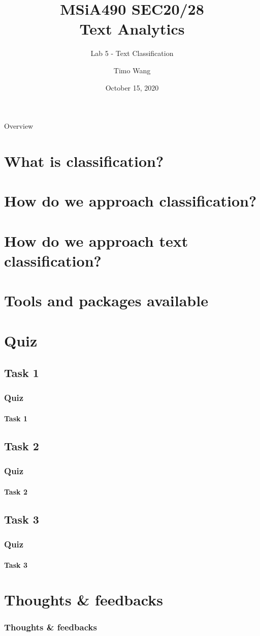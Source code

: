 \documentclass{beamer}
\begin{document}
\title{MSiA490 SEC20/28\\ Text Analytics}
\subtitle{Lab 5 - Text Classification}
\author{Timo Wang}
\date{October 15, 2020}

\begin{frame}
    \titlepage
\end{frame}

\begin{frame}{Overview}
    \tableofcontents[hideallsubsections]
\end{frame}

\section{What is classification?}

\section{How do we approach classification?}

\section{How do we approach text classification?}

\section{Tools and packages available}

\section{Quiz}
\subsection{Task 1}
\begin{frame}
    \frametitle{Quiz}
    \framesubtitle{Task 1}
\end{frame}

\subsection{Task 2}
\begin{frame}
    \frametitle{Quiz}
    \framesubtitle{Task 2}
\end{frame}

\subsection{Task 3}
\begin{frame}
    \frametitle{Quiz}
    \framesubtitle{Task 3}
\end{frame}

\section{Thoughts \& feedbacks}
\begin{frame}
    \frametitle{Thoughts \& feedbacks}
    
\end{frame}
\end{document}
